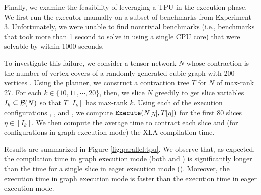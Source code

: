 Finally, we examine the feasibility of leveraging a TPU in the execution phase. We first run the  executor manually on a subset of benchmarks from Experiment 3. Unfortunately, we were unable to find nontrivial benchmarks (i.e., benchmarks that took more than 1 second to solve in  using a single CPU core) that were solvable by  within 1000 seconds.



To investigate this failure, we consider a tensor network $N$ whose contraction is the number of vertex covers of a randomly-generated cubic graph with 200 vertices \cite{KCMR18}. 
Using the  planner, we construct a contraction tree $T$ for $N$ of max-rank 27. 
For each $k \in \{10, 11, \cdots, 20\}$, then, we slice $N$ greedily to get slice variables $I_k \subseteq \mathcal{B}(N)$ so that $T[I_k]$ has max-rank $k$. 
Using each of the execution configurations , , and , we compute $\texttt{\upshape Execute}(N[\eta], T[\eta])$ for the first 80 slices $\eta \in [I_k]$. 
We then compute the average time to contract each slice and (for configurations in graph execution mode) the XLA compilation time.

Results are summarized in Figure \ref{fig:parallel:tpu}. 
We observe that, as expected, the compilation time in graph execution mode (both  and ) is significantly longer than the time for a single slice in eager execution mode (). 
Moreover, the execution time in graph execution mode is faster than the execution time in eager execution mode.

